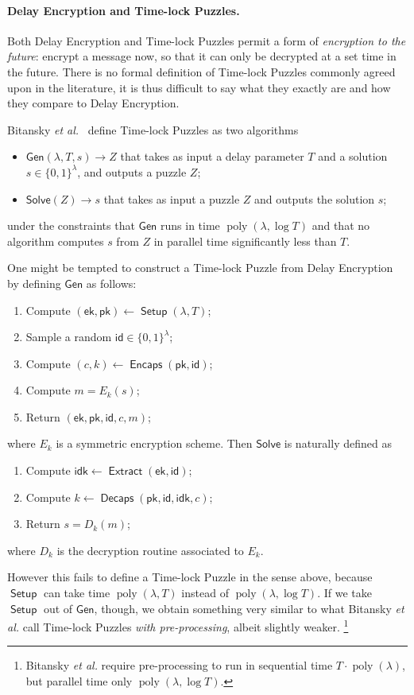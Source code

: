 \documentclass{llncs}
\DeclareMathOperator{\poly}{poly}
\DeclareMathOperator{\Setup}{\mathsf{Setup}}
\DeclareMathOperator{\Extract}{\mathsf{Extract}}
\DeclareMathOperator{\Encaps}{\mathsf{Encaps}}
\DeclareMathOperator{\Decaps}{\mathsf{Decaps}}
\newcommand{\ek}{\mathsf{ek}}
\newcommand{\pk}{\mathsf{pk}}
\newcommand{\id}{\mathsf{id}}
\newcommand{\idk}{\mathsf{idk}}
\begin{document}
\paragraph{Delay Encryption and Time-lock Puzzles.}
Both Delay Encryption and Time-lock Puzzles permit a form of
\emph{encryption to the future}: encrypt a message now, so that it can
only be decrypted at a set time in the future. %
There is no formal definition of Time-lock Puzzles commonly agreed
upon in the literature, it is thus difficult to say what they exactly
are and how they compare to Delay Encryption.

Bitansky \emph{et al.}~\cite{10.1145/2840728.2840745} define 
Time-lock Puzzles as two algorithms
\begin{itemize}
\item $\mathsf{Gen}(\lambda,T, s) \to Z$ that takes as input a delay parameter
  $T$ and a solution $s\in\{0,1\}^\lambda$, and outputs a puzzle $Z$;
\item $\mathsf{Solve}(Z) \to s$ that takes as input a puzzle $Z$ and
  outputs the solution $s$;
\end{itemize}
under the constraints that $\mathsf{Gen}$ runs in time
$\poly(\lambda,\log T)$ and that no algorithm computes $s$ from $Z$ in
parallel time significantly less than $T$.

One might be tempted to construct a Time-lock Puzzle from Delay
Encryption by defining $\mathsf{Gen}$ as follows:
\begin{enumerate}
\item Compute $(\ek,\pk) \gets \Setup(\lambda,T)$;
\item Sample a random $\id\in\{0,1\}^\lambda$;
\item Compute $(c,k) \gets \Encaps(\pk, \id)$;
\item Compute $m = E_k(s)$;
\item Return $(\ek,\pk,\id,c,m)$;
\end{enumerate}
where $E_k$ is a symmetric encryption scheme. %
Then $\mathsf{Solve}$ is naturally defined as
\begin{enumerate}
\item Compute $\idk \gets \Extract(\ek,\id)$;
\item Compute $k \gets \Decaps(\pk,\id,\idk,c)$;
\item Return $s = D_k(m)$;
\end{enumerate}
where $D_k$ is the decryption routine associated to $E_k$. %

However this fails to define a Time-lock Puzzle in the sense above,
because $\Setup$ can take time $\poly(\lambda,T)$ instead of
$\poly(\lambda,\log T)$. %
If we take $\Setup$ out of $\mathsf{Gen}$, though, we obtain something
very similar to what Bitansky \emph{et al.} call Time-lock Puzzles
\emph{with pre-processing}, albeit slightly weaker.%
\footnote{Bitansky \emph{et al.} require pre-processing to run in
  sequential time $T\cdot\poly(\lambda)$, but parallel time only
  $\poly(\lambda,\log T)$.}
\end{document}
